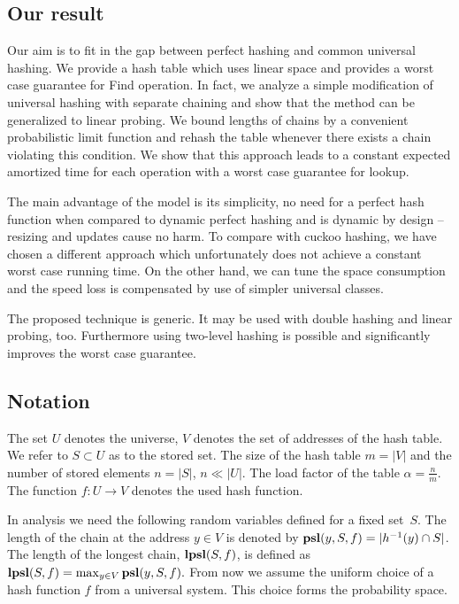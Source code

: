 \subsection{Our result}
Our aim is to fit in the gap between perfect hashing and common universal hashing.
We provide a hash table which uses linear space and provides a worst case guarantee for Find operation.
In fact, we analyze a simple modification of universal hashing with separate chaining and show that the method can be generalized to linear probing.
We bound lengths of chains by a convenient probabilistic limit function and rehash the table whenever there exists a chain violating this condition.
We show that this approach leads to a constant expected amortized time for each operation with a worst case guarantee for lookup.

The main advantage of the model is its simplicity, no need for a perfect hash function when compared to dynamic perfect hashing and is dynamic by design -- resizing and updates cause no harm.
To compare with cuckoo hashing, we have chosen a different approach which unfortunately does not achieve a constant worst case running time.
On the other hand, we can tune the space consumption and the speed loss is compensated by use of simpler universal classes.

The proposed technique is generic. It may be used with double hashing and linear probing, too. 
Furthermore using two-level hashing is possible and significantly improves the worst case guarantee.

\subsection{Notation}
The set $U$ denotes the universe, $V$ denotes the set of addresses of the hash table.
We refer to $S \subset U$ as to the stored set.
The size of the hash table $m = |V|$ and the number of stored elements $n = |S|$, $n \ll |U|$. 
The load factor of the table $\alpha = \frac{n}{m}$.
The function $f\colon U \rightarrow V$ denotes the used hash function. 

In analysis we need the following random variables defined for a fixed set~$S$.
The length of the chain at the address $y \in V$ is denoted by $\mathbf{psl}(y, S, f) = |h^{-1}(y) \cap S|$. 
The length of the longest chain, $\mathbf{lpsl}(S, f)$, is defined as $\mathbf{lpsl}(S, f) = \max_{y \in V} \mathbf{psl}(y, S, f).$
From now we assume the uniform choice of a hash function $f$ from a universal system. 
This choice forms the probability space.

